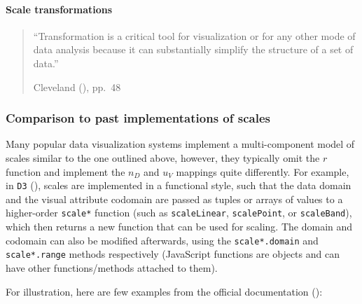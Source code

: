 \documentclass[
  openany]{book}
\theoremstyle{definition}
\theoremstyle{definition}
\theoremstyle{definition}
\theoremstyle{definition}
\theoremstyle{remark}
\begin{document}
\paragraph{Scale transformations}\label{scale-transformations}

\begin{quote}
``Transformation is a critical tool for visualization or for any other mode of data analysis
because it can substantially simplify the structure of a set of data.''

Cleveland (), pp.~48
\end{quote}

\subsubsection{Comparison to past implementations of scales}\label{scales-comparison}

Many popular data visualization systems implement a multi-component model of scales similar to the one outlined above, however, they typically omit the \(r\) function and implement the \(n_D\) and \(u_V\) mappings quite differently. For example, in \texttt{D3} (), scales are implemented in a functional style, such that the data domain and the visual attribute codomain are passed as tuples or arrays of values to a higher-order \texttt{scale*} function (such as \texttt{scaleLinear}, \texttt{scalePoint}, or \texttt{scaleBand}), which then returns a new function that can be used for scaling. The domain and codomain can also be modified afterwards, using the \texttt{scale*.domain} and \texttt{scale*.range} methods respectively (JavaScript functions are objects and can have other functions/methods attached to them).

For illustration, here are few examples from the official documentation ():
\end{document}
